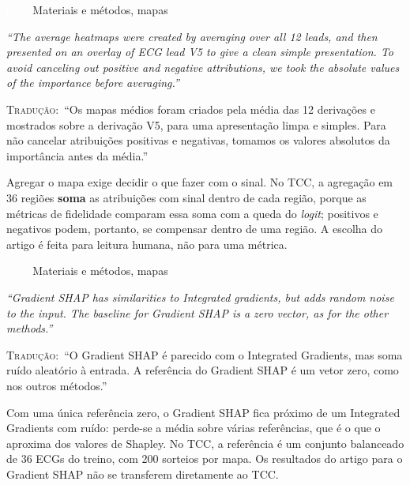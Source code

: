 \documentclass[11pt,a4paper]{article}
\newcommand{\pagechip}[1]{{\setlength{\fboxsep}{1.5pt}\colorbox{cAcc}{\textcolor{white}{\scriptsize\texttt{#1}}}}}
\newenvironment{origquote}{\par\itshape\small}{\par}
\newenvironment{tradquote}{\par\small\textsc{Tradução:}\ }{\par}
\newcommand{\explab}[1]{\par\smallskip{\small\color{cAcc}\textbf{\MakeUppercase{#1}}}\par}
\begin{document}
\begin{citacard}{\pagechip{p. 2} Materiais e métodos, mapas}
\begin{origquote}“The average heatmaps were created by averaging over all 12 leads, and then presented on an overlay of ECG lead V5 to give a clean simple presentation. To avoid canceling out positive and negative attributions, we took the absolute values of the importance before averaging.”\end{origquote}
\begin{tradquote}“Os mapas médios foram criados pela média das 12 derivações e mostrados sobre a derivação V5, para uma apresentação limpa e simples. Para não cancelar atribuições positivas e negativas, tomamos os valores absolutos da importância antes da média.”\end{tradquote}
\explab{Explicação}
Agregar o mapa exige decidir o que fazer com o sinal. No TCC, a agregação em 36 regiões \textbf{soma} as atribuições com sinal dentro de cada região, porque as métricas de fidelidade comparam essa soma com a queda do \textit{logit}; positivos e negativos podem, portanto, se compensar dentro de uma região. A escolha do artigo é feita para leitura humana, não para uma métrica.
\end{citacard}

\begin{citacard}{\pagechip{p. 2} Materiais e métodos, mapas}
\begin{origquote}“Gradient SHAP has similarities to Integrated gradients, but adds random noise to the input. The baseline for Gradient SHAP is a zero vector, as for the other methods.”\end{origquote}
\begin{tradquote}“O Gradient SHAP é parecido com o Integrated Gradients, mas soma ruído aleatório à entrada. A referência do Gradient SHAP é um vetor zero, como nos outros métodos.”\end{tradquote}
\explab{Explicação}
Com uma única referência zero, o Gradient SHAP fica próximo de um Integrated Gradients com ruído: perde-se a média sobre várias referências, que é o que o aproxima dos valores de Shapley. No TCC, a referência é um conjunto balanceado de 36 ECGs do treino, com 200 sorteios por mapa. Os resultados do artigo para o Gradient SHAP não se transferem diretamente ao TCC.
\end{citacard}
\end{document}
